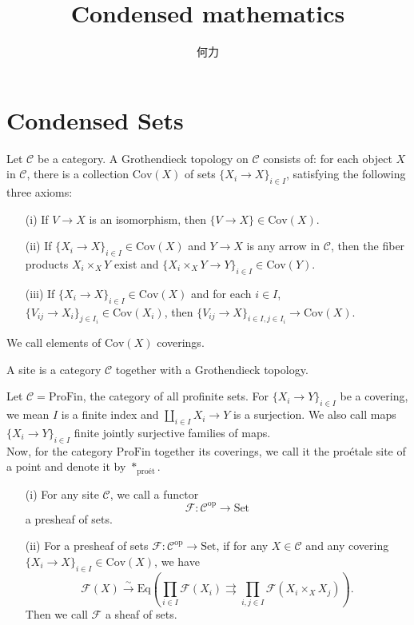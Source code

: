 \documentclass[UTF8,12,a4paper]{ctexart}
\theoremstyle{definition}
\begin{document}
\title{\vspace{-6em}\Large{Condensed mathematics}}
\date{}
\author{何力}
\maketitle	
\tableofcontents
\newpage
\section{Condensed Sets}
\dfn 
Let $\mathcal{C}$ be a category. A Grothendieck topology on $\mathcal{C}$ consists of: for each object $X$ in $\mathcal{C}$, there is a collection $\text{Cov}(X)$ of sets $\{X_i\to X\}_{i\in I}$, satisfying the following three axioms:
\begin{itemize}
	\item [(i)] If $V\to X$ is an isomorphism, then $\{V\to X\}\in \text{Cov}(X).$
	\item [(ii)] If $\{X_i\to X\}_{i\in I}\in \text{Cov}(X)$ and $Y\to X$ is any arrow in $\mathcal{C}$, then the fiber products $X_i\times_{X} Y$ exist and $\{X_i\times_{X} Y\to Y\}_{i\in I}\in \text{Cov}(Y).$
	\item [(iii)] If $\{X_i\to X\}_{i\in I}\in \text{Cov}(X)$ and for each $i\in I$, $\{V_{ij}\to X_i\}_{j\in I_i}\in \text{Cov}(X_i)$, then $\{V_{ij}\to X\}_{i\in I, j\in I_i}\to \text{Cov}(X).$
\end{itemize}
We call elements of $\text{Cov}(X)$ coverings.

\dfn 
A site is a category $\mathcal{C}$ together with a Grothendieck topology.

\exm 
Let $\mathcal{C}=\text{ProFin}$, the category of all profinite sets. For $\{X_i\to Y\}_{i\in I}$ be a covering, we mean $I$ is a finite index and $\coprod_{i\in I} X_i\to Y$ is a surjection. We also call maps $\{X_i\to Y\}_{i\in I}$ finite jointly surjective families of maps.\\
Now, for the category $\text{ProFin}$ together its coverings, we call it the pro\'etale site of a point and denote it by $*_{\text{pro\'et}}$.

\dfn 
\begin{itemize}
	\item [(i)] For any site $\mathcal{C}$, we call a functor 
	$$\mathcal{F}:\mathcal{C}^\text{op}\rightarrow\text{Set}$$
	a presheaf of sets.
	\item [(ii)] For a presheaf of sets $\mathcal{F}:\mathcal{C}^\text{op}\rightarrow\text{Set}$, if for any $X\in\mathcal{C}$ and any covering $\{X_i\to X\}_{i\in I}\in \text{Cov}(X)$, we have
	$$
	\mathcal{F}(X)\stackrel{\sim}{\longrightarrow}\text{Eq}(\prod_{i\in I}\mathcal{F}(X_i)\rightrightarrows \prod_{i,j\in I}\mathcal{F}(X_i\times_{X} X_j)).
	$$
	Then we call $\mathcal{F}$ a sheaf of sets.
\end{itemize}
\end{document}
